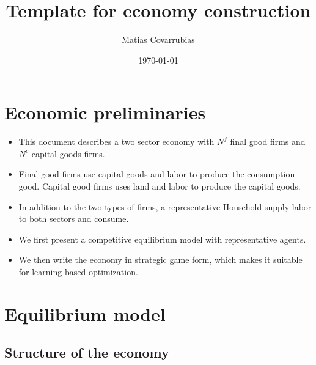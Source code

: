 \documentclass[11pt]{article}
\numberwithin{equation}{section}
\begin{document}
\title{Template for economy construction}

\author{Matias Covarrubias}

\medskip

\date{\today}

\thispagestyle{empty}



\newpage
\section{Economic preliminaries}

\begin{itemize}
	\item This document describes a two sector economy with $N^f$ final good firms and $N^c$ capital goods firms. \medskip
	
	\item Final good firms use capital goods and labor to produce the consumption good. Capital good firms uses land and labor to produce the capital goods.  \medskip
	
	\item In addition to the two types of firms, a representative Household supply labor to both sectors and consume. \medskip
	
	\item We first present a competitive equilibrium model with representative agents. \medskip
	
	\item We then write the economy in strategic game form, which makes it suitable for learning based optimization. \medskip
\end{itemize}

\section{Equilibrium model}

\subsection{Structure of the economy}
\end{document}
